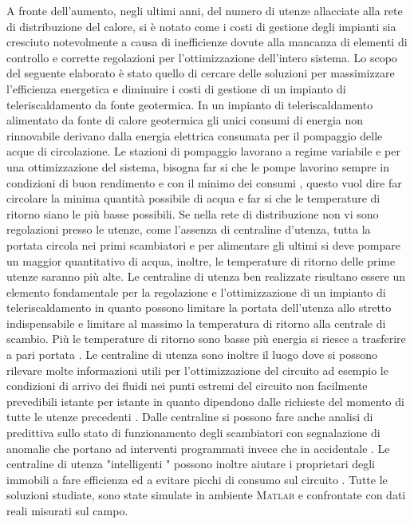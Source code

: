 \documentclass[laurea,oneside,11pt]{USiena_tesiLM}
\begin{document}
A fronte dell'aumento, negli ultimi anni, del numero di utenze allacciate alla rete di distribuzione del calore, si è notato come i costi di gestione degli impianti sia cresciuto notevolmente a causa di inefficienze dovute alla mancanza di elementi di controllo e corrette regolazioni per l'ottimizzazione dell'intero sistema.
Lo scopo del seguente elaborato è stato quello di cercare delle soluzioni per massimizzare l'efficienza energetica e diminuire i costi di gestione di un impianto di teleriscaldamento da fonte geotermica. In un impianto di teleriscaldamento alimentato da fonte di calore geotermica gli unici consumi di energia non rinnovabile  derivano dalla energia elettrica consumata  per il pompaggio delle acque di circolazione. 
Le stazioni di pompaggio lavorano a regime variabile e per una ottimizzazione del sistema, bisogna far si che le pompe lavorino sempre in condizioni di buon rendimento e con il minimo dei consumi , questo vuol dire far circolare la minima quantità possibile di acqua e far si che le temperature di ritorno siano le più basse possibili. Se nella rete di distribuzione non vi sono regolazioni presso le utenze, come l'assenza di centraline d'utenza, tutta la portata circola nei primi scambiatori e per alimentare gli ultimi si deve pompare un maggior quantitativo di acqua, inoltre, le temperature di ritorno delle prime utenze saranno più alte. Le centraline di utenza ben realizzate risultano essere un elemento fondamentale per la regolazione e l'ottimizzazione di un impianto di teleriscaldamento in quanto possono  limitare la portata dell'utenza allo stretto indispensabile e limitare al massimo la temperatura di ritorno alla centrale di scambio. Più le temperature di ritorno sono basse più energia si riesce a trasferire a pari portata . Le centraline di utenza sono inoltre il luogo dove si possono rilevare molte informazioni utili per l'ottimizzazione del circuito ad esempio le condizioni di arrivo dei fluidi nei punti estremi del circuito non facilmente prevedibili istante per istante in quanto dipendono dalle richieste del momento di tutte le utenze precedenti .
Dalle centraline si possono fare anche analisi di predittiva sullo stato di funzionamento degli scambiatori con segnalazione di anomalie che portano ad interventi programmati invece che in accidentale .
Le centraline di utenza "intelligenti " possono inoltre aiutare i proprietari degli immobili a fare efficienza ed a evitare picchi di consumo sul circuito .
Tutte le soluzioni studiate, sono state simulate in ambiente \textsc{Matlab} e confrontate con dati reali misurati sul campo.
\end{document}
